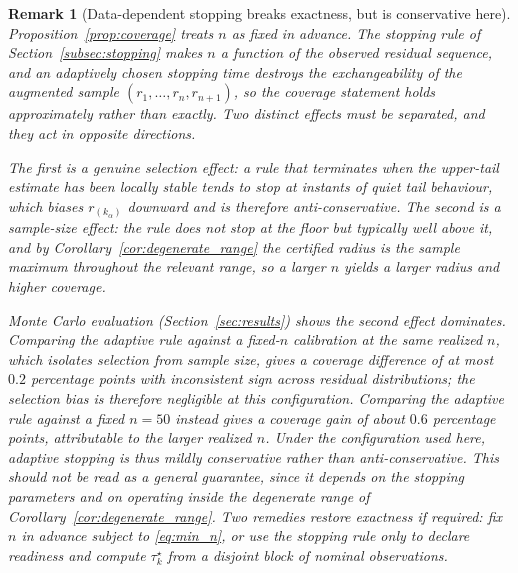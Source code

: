 \documentclass[a4paper]{cas-sc}
\newtheorem{remark}{Remark}
\newcommand{\residual}{\ensuremath{r}}
\begin{document}
\begin{remark}[Data-dependent stopping breaks exactness, but is conservative here]
\label{rem:optional_stopping}
Proposition~\ref{prop:coverage} treats \(n\) as fixed in advance. The
stopping rule of Section~\ref{subsec:stopping} makes \(n\) a function of
the observed residual sequence, and an adaptively chosen stopping time
destroys the exchangeability of the augmented sample
\((\residual_1,\ldots,\residual_n,\residual_{n+1})\), so the coverage
statement holds approximately rather than exactly. Two distinct effects must
be separated, and they act in opposite directions.

The first is a genuine selection effect: a rule that terminates when the
upper-tail estimate has been locally stable tends to stop at instants of
quiet tail behaviour, which biases \(\residual_{(k_\alpha)}\) downward and
is therefore anti-conservative. The second is a sample-size effect: the rule
does not stop at the floor but typically well above it, and by
Corollary~\ref{cor:degenerate_range} the certified radius is the sample
maximum throughout the relevant range, so a larger \(n\) yields a larger
radius and higher coverage.

Monte Carlo evaluation (Section~\ref{sec:results}) shows the second effect
dominates. Comparing the adaptive rule against a fixed-\(n\) calibration at
the \emph{same} realized \(n\), which isolates selection from sample size,
gives a coverage difference of at most \(0.2\) percentage points with
inconsistent sign across residual distributions; the selection bias is
therefore negligible at this configuration. Comparing the adaptive rule
against a fixed \(n=50\) instead gives a coverage \emph{gain} of about
\(0.6\) percentage points, attributable to the larger realized \(n\). Under
the configuration used here, adaptive stopping is thus mildly conservative
rather than anti-conservative. This should not be read as a general
guarantee, since it depends on the stopping parameters and on operating
inside the degenerate range of
Corollary~\ref{cor:degenerate_range}. Two remedies restore exactness if
required: fix \(n\) in advance subject to \eqref{eq:min_n}, or use the
stopping rule only to declare readiness and compute \(\tau_k^\star\) from a
disjoint block of nominal observations.
\end{remark}
\end{document}
